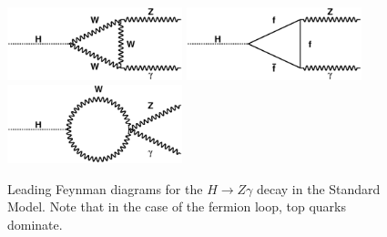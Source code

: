 \begin{figure}[!htbp]
  \begin{center}
  {\includegraphics[width=2in]{figures/loop1}}
  {\includegraphics[width=2in]{figures/loop2}}
  {\includegraphics[width=2in]{figures/loop3}}
  \caption{Leading Feynman diagrams for the $H\rightarrow Z\gamma$
    decay in the Standard Model. Note that in the case of the fermion
    loop, top quarks dominate.} 
  \label{fig:feynman}
  \end{center}
\end{figure}
